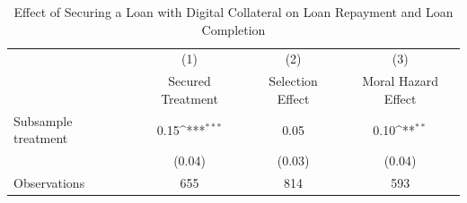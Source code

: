 \begin{table}[htbp]\centering
\def\sym#1{\ifmmode^{#1}\else\(^{#1}\)\fi}
\caption{Effect of Securing a Loan with Digital Collateral on Loan Repayment and Loan Completion\label{LASMH\_complete\_ITT\_150}}
\begin{tabular}{l*{3}{c}}
\toprule
                    &\multicolumn{1}{c}{(1)}&\multicolumn{1}{c}{(2)}&\multicolumn{1}{c}{(3)}\\
                    &\multicolumn{1}{c}{Secured Treatment}&\multicolumn{1}{c}{Selection Effect}&\multicolumn{1}{c}{Moral Hazard Effect}\\
\midrule
Subsample treatment &        0.15\sym{***}&        0.05         &        0.10\sym{**} \\
                    &      (0.04)         &      (0.03)         &      (0.04)         \\
\midrule
Observations        &         655         &         814         &         593         \\
\bottomrule
\end{tabular}
\end{table}
